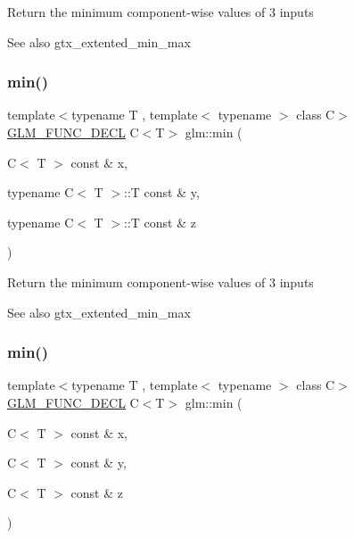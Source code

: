 Return the minimum component-\/wise values of 3 inputs \begin{DoxySeeAlso}{See also}
gtx\+\_\+extented\+\_\+min\+\_\+max 
\end{DoxySeeAlso}
\mbox{\label{group__gtx__extended__min__max_ga74d1a96e7cdbac40f6d35142d3bcbbd4}} 
\subsubsection{\texorpdfstring{min()}{min()}\hspace{0.1cm}{\footnotesize\ttfamily [2/6]}}
{\footnotesize\ttfamily template$<$typename T , template$<$ typename $>$ class C$>$ \\
\hyperlink{setup_8hpp_ab2d052de21a70539923e9bcbf6e83a51}{G\+L\+M\+\_\+\+F\+U\+N\+C\+\_\+\+D\+E\+CL} C$<$T$>$ glm\+::min (\begin{DoxyParamCaption}\item[{C$<$ T $>$ const \&}]{x,  }\item[{typename C$<$ T $>$\+::T const \&}]{y,  }\item[{typename C$<$ T $>$\+::T const \&}]{z }\end{DoxyParamCaption})}

Return the minimum component-\/wise values of 3 inputs \begin{DoxySeeAlso}{See also}
gtx\+\_\+extented\+\_\+min\+\_\+max 
\end{DoxySeeAlso}
\mbox{\label{group__gtx__extended__min__max_ga42b5c3fc027fd3d9a50d2ccc9126d9f0}} 
\subsubsection{\texorpdfstring{min()}{min()}\hspace{0.1cm}{\footnotesize\ttfamily [3/6]}}
{\footnotesize\ttfamily template$<$typename T , template$<$ typename $>$ class C$>$ \\
\hyperlink{setup_8hpp_ab2d052de21a70539923e9bcbf6e83a51}{G\+L\+M\+\_\+\+F\+U\+N\+C\+\_\+\+D\+E\+CL} C$<$T$>$ glm\+::min (\begin{DoxyParamCaption}\item[{C$<$ T $>$ const \&}]{x,  }\item[{C$<$ T $>$ const \&}]{y,  }\item[{C$<$ T $>$ const \&}]{z }\end{DoxyParamCaption})}

